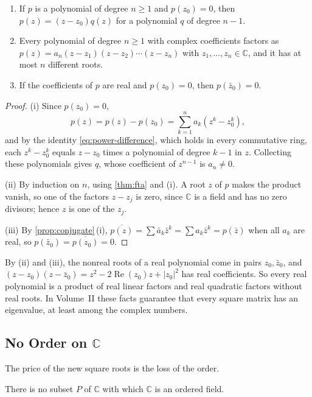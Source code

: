 \begin{corollary}
\label{cor:factor}
\leavevmode
\begin{enumerate}
\item If $p$ is a polynomial of degree $n\ge1$ and $p(z_0)=0$, then $p(z)=(z-z_0)q(z)$ for a polynomial $q$ of degree $n-1$.
\item Every polynomial of degree $n\ge1$ with complex coefficients factors as $p(z)=a_n(z-z_1)(z-z_2)\cdots(z-z_n)$ with $z_1,\ldots,z_n\in\mathbb C$, and it has at most $n$ different roots.
\item If the coefficients of $p$ are real and $p(z_0)=0$, then $p(\bar z_0)=0$.
\end{enumerate}
\end{corollary}

\begin{proof}
(i) Since $p(z_0)=0$,
\[
p(z)=p(z)-p(z_0)=\sum_{k=1}^na_k(z^k-z_0^k),
\]
and by the identity \eqref{eq:power-difference}, which holds in every commutative ring, each $z^k-z_0^k$ equals $z-z_0$ times a polynomial of degree $k-1$ in $z$. Collecting these polynomials gives $q$, whose coefficient of $z^{n-1}$ is $a_n\ne0$.

(ii) By induction on $n$, using \cref{thm:fta} and (i). A root $z$ of $p$ makes the product vanish, so one of the factors $z-z_j$ is zero, since $\mathbb C$ is a field and has no zero divisors; hence $z$ is one of the $z_j$.

(iii) By \cref{prop:conjugate}\,(i), $\overline{p(z)}=\sum\bar a_k\bar z^k=\sum a_k\bar z^k=p(\bar z)$ when all $a_k$ are real, so $p(\bar z_0)=\overline{p(z_0)}=0$.
\end{proof}

By (ii) and (iii), the nonreal roots of a real polynomial come in pairs $z_0,\bar z_0$, and $(z-z_0)(z-\bar z_0)=z^2-2\operatorname{Re}(z_0)z+|z_0|^2$ has real coefficients. So every real polynomial is a product of real linear factors and real quadratic factors without real roots. In Volume~II these facts guarantee that every square matrix has an eigenvalue, at least among the complex numbers.

\subsection{No Order on $\mathbb C$}

The price of the new square roots is the loss of the order.

\begin{proposition}
\label{prop:c-not-ordered}
There is no subset $P$ of $\mathbb C$ with which $\mathbb C$ is an ordered field.
\end{proposition}

